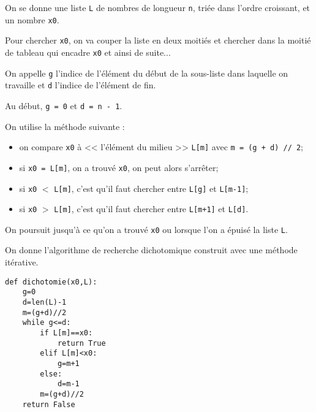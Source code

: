 %
%
%

\begin{multicols}{2}
On se donne une liste \texttt{L} de nombres de longueur \texttt{n}, {triée dans l'ordre croissant}, et un nombre \texttt{x0}. 

Pour chercher \texttt{x0}, on va couper la liste en deux moitiés et chercher dans la moitié de tableau qui encadre \texttt{x0} et ainsi de suite...

On appelle \texttt{g} l'indice de l'élément du début de la sous-liste dans laquelle on travaille et \texttt{d} l'indice de l'élément de fin.

Au début, \texttt{g = 0} et \texttt{d = n - 1}.

%

On utilise la méthode suivante :
\begin{itemize}
\item on compare \texttt{x0} à << l'élément du milieu >>  \texttt{L[m]} avec \texttt{m = (g + d) // 2};
\item si \texttt{x0 = L[m]}, on a trouvé \texttt{x0}, on peut alors s'arrêter;
\item si \texttt{x0} $<$ \texttt{L[m]}, c'est qu'il faut chercher entre \texttt{L[g]} et  \texttt{L[m-1]};%
\item si \texttt{x0} $>$ \texttt{L[m]}, c'est qu'il faut chercher  entre \texttt{L[m+1]} et \texttt{L[d]}.%
\end{itemize}

On poursuit jusqu'à ce qu'on a trouvé \texttt{x0} ou lorsque l'on a épuisé la liste \texttt{L}.

On donne l'algorithme de recherche dichotomique construit avec une méthode itérative.

\begin{lstlisting}
def dichotomie(x0,L):
    g=0
    d=len(L)-1
    m=(g+d)//2
    while g<=d:
        if L[m]==x0:
            return True
        elif L[m]<x0:
            g=m+1
        else:
            d=m-1
        m=(g+d)//2
    return False
\end{lstlisting}

\end{multicols}

